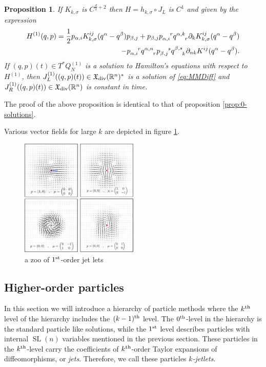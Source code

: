\documentclass[12pt]{amsart}
\newcommand{\R}{\ensuremath{\mathbb{R}}}
\newtheorem{prop}[thm]{Proposition}
\DeclareMathOperator{\SL}{SL}
\begin{document}
  \begin{prop} \label{prop:1-solutions}
  	If $K_{k,\sigma}$ is $C^{\frac{d}{2} + 2}$ then $H = h_{k,\sigma} \circ J_L$
	is $C^1$ and given by the expression
	\begin{align*}
		H^{(1)}(q,p) = \frac{1}{2} p_{\alpha,i} K^{ij}_{k,\sigma}(q^\alpha - q^\beta) p_{\beta,j}
			+ p_{\beta,j} p \indices{_{\alpha,i}^r} q \indices{^{\alpha,k}_r} \partial_k K^{ij}_{k,\sigma}( q^\alpha - q^\beta) \\
			- p\indices{_{\alpha,i}^r} q\indices{^{\alpha,n}_r} p\indices{_{\beta,j}^s} q\indices{^{\beta,s}_k} \partial_{nk} K^{ij}(q^\alpha - q^\beta).
	\end{align*}
	If $(q,p)(t) \in T^*Q_N^{(1)}$ is a solution to Hamilton's equations with respect to 
	$H^{(1)}$, then $J_L^{(1)}( (q,p)(t)) \in \mathfrak{X}_{\rm div}(\R^n)^*$ is
	a solution of \eqref{eq:MMDiff} and $J_R^{(1)}( (q,p)(t)) \in \mathfrak{X}_{\rm div}(\R^n)$ is
	constant in time. 
  \end{prop}
  The proof of the above proposition is identical to that of proposition \ref{prop:0-solutions}.
  
  Various vector fields for large $k$
  are depicted in figure \ref{fig:zoo}.
  
  \begin{figure}
  	\centering
	\includegraphics[width=0.5\textwidth]{./images/zoo}
	\caption{a zoo of $1^{\rm st}$-order jet lets}
	\label{fig:zoo}
  \end{figure}

  \subsection{Higher-order particles}
  \label{sec:higher_order}
  In this section we will introduce a hierarchy of particle methods
  where the $k^{\rm th}$ level of the hierarchy includes the $(k-1)^{\rm th}$
  level.
  The $0^{\rm th}$-level in the hierarchy is the standard particle like solutions,
  while the $1^{\rm st}$ level describes particles with internal $\SL(n)$ variables
  mentioned in the previous section.
  These particles in the $k^{\rm th}$-level carry the coefficients of
  $k^{\rm th}$-order Taylor expansions of diffeomorphisms,
  or \emph{jets}.
  Therefore, we call these particles \emph{$k$-jetlets}.
\end{document}
